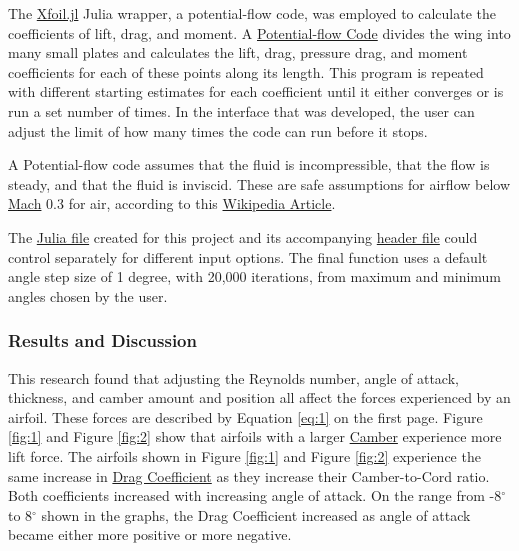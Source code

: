 \documentclass{article}
\begin{document}
The \href{https://docs.juliahub.com/Xfoil/Mlbda/0.4.0/}{Xfoil.jl} Julia wrapper, a potential-flow code, was employed to calculate the coefficients of lift, drag, and moment. A \hyperlink{PFC}{Potential-flow Code} divides the wing into many small plates and calculates the lift, drag, pressure drag, and moment coefficients for each of these points along its length. This program is repeated with different starting estimates for each coefficient until it either converges or is run a set number of times. In the interface that was developed, the user can adjust the limit of how many times the code can run before it stops.\newline

A Potential-flow code assumes that the fluid is incompressible, that the flow is steady, and that the fluid is inviscid. These are safe assumptions for airflow below \hyperlink{M}{Mach} 0.3 for air, according to this \href{https://en.wikipedia.org/wiki/Compressible_flow}{Wikipedia Article}. \newline

The \href{https://github.com/JoeSpencer1/497R-Projects/blob/Airfoil-Analysis/Airfoil_Analysis.jl}{Julia file} created for this project and its accompanying \href{https://github.com/JoeSpencer1/497R-Projects/blob/Airfoil-Analysis/Airfoil_Functions.jl}{header file} could control separately for different input options. The final function uses a default angle step size of 1 degree, with 20,000 iterations, from maximum and minimum angles chosen by the user.\newline

\subsubsection*{Results and Discussion}

This research found that adjusting the Reynolds number, angle of attack, thickness, and camber amount and position all affect the forces experienced by an airfoil. These forces are described by Equation \ref{eq:1} on the first page. Figure \ref{fig:1} and Figure \ref{fig:2} show that airfoils with a larger \hyperlink{c}{Camber} experience more lift force. The airfoils shown in Figure \ref{fig:1} and Figure \ref{fig:2} experience the same increase in \hyperlink{CD}{Drag Coefficient} as they increase their Camber-to-Cord ratio. Both coefficients increased with increasing angle of attack. On the range from -8$^{\circ}$ to 8$^{\circ}$ shown in the graphs, the Drag Coefficient increased as angle of attack became either more positive or more negative.\newline
\end{document}
